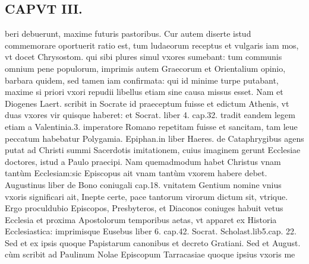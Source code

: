 \documentclass{article}
\begin{document}
\begin{pages}
\section*{CAPVT  III. }
\marginpar{[ p.107 ]}\pstart beri debuerunt, maxime futuris pastoribus. Cur autem diserte istud commemorare oportuerit ratio est, tum ludaeorum receptus et vulgaris iam mos, vt docet Chrysostom. qui sibi plures simul vxores sumebant: tum communis omnium pene populorum, imprimis autem Graecorum et Orientalium opinio, barbara quidem, sed tamen iam confirmata: qui id minime turpe putabant, maxime si priori vxori repudii libellus etiam sine causa missus esset. Nam et Diogenes Laert. scribit in Socrate id praeceptum fuisse et edictum Athenis, vt duas vxores vir quisque haberet: et Socrat. liber 4. cap.32. tradit eandem legem etiam a Valentinia.3. imperatore Romano repetitam fuisse et sancitam, tam leue peccatum habebatur Polygamia.  \pend\pstart Epiphan.in liber  Haeres. de Cataphrygibus  agens putat ad Christi summi Sacerdotis imitationem, cuius imaginem gerunt Ecclesiae doctores, istud a Paulo praecipi. Nam quemadmodum habet Christus vnam tantùm Ecclesiam:sic Episcopus ait vnam tantùm vxorem habere debet. Augustinus liber  de Bono coniugali cap.18. vnitatem Gentium nomine vnius vxoris significari ait, Inepte certe, pace tantorum virorum dictum sit, vtrique. Ergo proculdubio Episcopos, Presbyteros, et Diaconos coniuges habuit vetus Ecclesia et proxima Apostolorum temporibus aetas, vt apparet ex Historia Ecclesiastica: imprimisque Eusebus liber  6. cap.42. Socrat. Scholast.lib5.cap. 22. Sed et ex ipsis quoque Papistarum canonibus et decreto Gratiani. Sed et August. cùm scribit ad Paulinum Nolae Episcopum Tarracasiae quoque ipsius vxoris me\pend

\end{pages}
\end{document}
